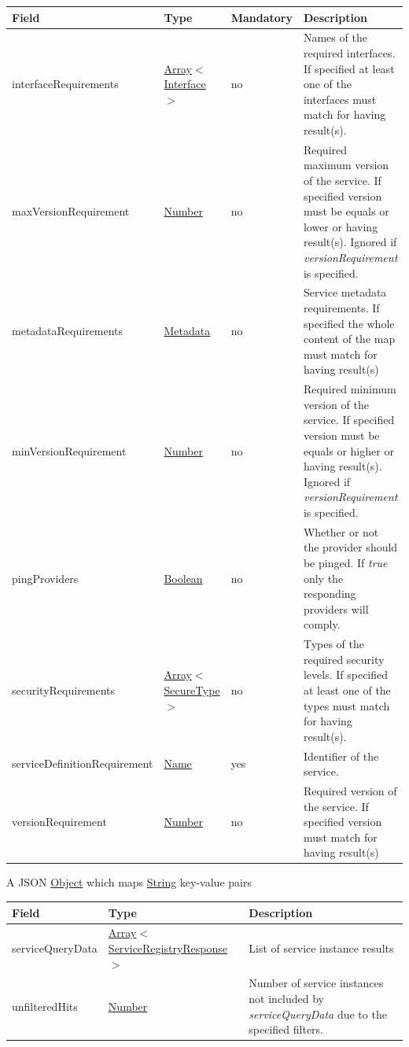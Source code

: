 \documentclass[a4paper]{arrowhead}
\newcommand{\pref}[1]{{\textcolor{ArrowheadGrey}{\hyperref[sec:model:primitives:#1]{#1}}}}
\begin{document}
\begin{table}[ht!]
\begin{tabularx}{\textwidth}{| p{5cm} | p{3cm} | p{2cm} | X |} \hline
\rowcolor{gray!33} Field & Type & Mandatory & Description \\ \hline
interfaceRequirements &\pref{Array}$<$\pref{Interface}$>$ & no & Names of the required interfaces. If specified at least one of the interfaces must match for having result(s). \\ \hline
maxVersionRequirement &\pref{Number} & no & Required maximum version of the service. If specified version must be equals or lower or having result(s). Ignored if \textit{versionRequirement} is specified. \\ \hline
metadataRequirements &\pref{Metadata} & no & Service metadata requirements. If specified the whole content of
the map must match for having result(s) \\ \hline
minVersionRequirement &\pref{Number} & no & Required minimum version of the service. If specified version must be equals or higher or having result(s). Ignored if \textit{versionRequirement} is specified. \\ \hline
pingProviders &\pref{Boolean} & no & Whether or not the provider should be pinged. If \textit{true} only the responding providers will comply. \\ \hline
securityRequirements &\pref{Array}$<$\pref{SecureType}$>$ & no & Types of the required security levels. If specified at least one of the types must match for having result(s). \\ \hline
serviceDefinitionRequirement &\pref{Name} & yes & Identifier of the service. \\ \hline
versionRequirement &\pref{Number} & no & Required version of the service. If specified version must match for having result(s) \\ \hline
\end{tabularx}
\end{table}


A JSON \pref{Object} which maps \pref{String} key-value pairs

\clearpage


\begin{table}[ht!]
\begin{tabularx}{\textwidth}{| p{3cm} | p{6cm} | X |} \hline
\rowcolor{gray!33} Field & Type      & Description \\ \hline
serviceQueryData & \pref{Array}$<$\pref{ServiceRegistryResponse}$>$     & List of service instance results \\ \hline
unfilteredHits & \pref{Number} & Number of service instances not included by \textit{serviceQueryData} due to the specified filters. \\ \hline
\end{tabularx}
\end{table}
\end{document}
